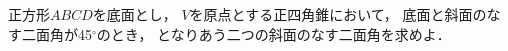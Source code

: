 \documentclass[../../main.tex]{subfiles}
\begin{document}
正方形$ABCD$を底面とし，
$V$を原点とする正四角錐において，
底面と斜面のなす二面角が45$^\circ$のとき，
となりあう二つの斜面のなす二面角を求めよ．
\end{document}
